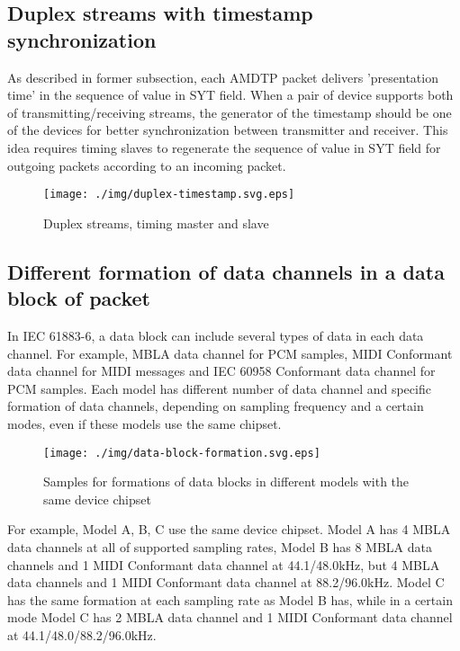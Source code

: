 \documentclass[onecolumn]{article}
\begin{document}
\subsection{Duplex streams with timestamp synchronization}
\label{sec:duplex-streams}

As described in former subsection, each AMDTP packet delivers 'presentation time' in the sequence of value in SYT field. When a pair of device supports both of transmitting/receiving streams, the generator of the timestamp should be one of the devices for better synchronization between transmitter and receiver. This idea requires timing slaves to regenerate the sequence of value in SYT field for outgoing packets according to an incoming packet.

\begin{figure}[H]
	\centering
	\texttt{[image: ./img/duplex-timestamp.svg.eps]}
	\caption{{Duplex streams, timing master and slave}}
	\label{duplex-timestamp}
\end{figure}


\subsection{Different formation of data channels in a data block of packet}
\label{sec:formation-data-block}

In IEC 61883-6\cite{iec61883-6-1, iec61883-6-2}, a data block can include several types of data in each data channel. For example, MBLA data channel for PCM samples, MIDI Conformant data channel for MIDI messages and IEC 60958 Conformant data channel for PCM samples. Each model has different number of data channel and specific formation of data channels, depending on sampling frequency and a certain modes, even if these models use the same chipset.

\begin{figure}[H]
	\centering
	\texttt{[image: ./img/data-block-formation.svg.eps]}
	\caption{{Samples for formations of data blocks in different models with the same device chipset}}
	\label{dsp-route}
\end{figure}

For example, Model A, B, C use the same device chipset. Model A has 4 MBLA data channels at all of supported sampling rates, Model B has 8 MBLA data channels and 1 MIDI Conformant data channel at 44.1/48.0kHz, but 4 MBLA data channels and 1 MIDI Conformant data channel at 88.2/96.0kHz. Model C has the same formation at each sampling rate as Model B has, while in a certain mode Model C has 2 MBLA data channel and 1 MIDI Conformant data channel at 44.1/48.0/88.2/96.0kHz.
\end{document}
